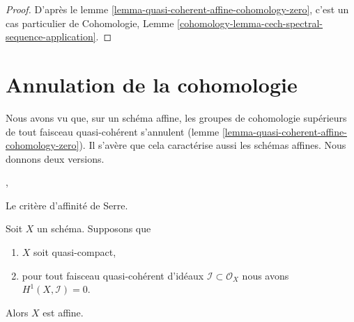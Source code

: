 \begin{proof}
D'après le
lemme \ref{lemma-quasi-coherent-affine-cohomology-zero},
c'est un cas particulier de
Cohomologie, Lemme
\ref{cohomology-lemma-cech-spectral-sequence-application}.
\end{proof}







\section{Annulation de la cohomologie}
\label{section-vanishing}

\noindent
Nous avons vu que, sur un schéma affine, les groupes de cohomologie supérieurs
de tout faisceau quasi-cohérent s'annulent
(lemme \ref{lemma-quasi-coherent-affine-cohomology-zero}).
Il s'avère que cela caractérise aussi
les schémas affines. Nous donnons deux versions.

\begin{lemma}
\label{lemma-quasi-compact-h1-zero-covering}
\begin{reference}
\cite{Serre-criterion}, \cite[II, Théorème 5.2.1 (d') et IV (1.7.17)]{EGA}
\end{reference}
\begin{slogan}
Le critère d'affinité de Serre.
\end{slogan}
Soit $X$ un schéma.
Supposons que
\begin{enumerate}
\item $X$ soit quasi-compact,
\item pour tout faisceau quasi-cohérent d'idéaux
$\mathcal{I} \subset \mathcal{O}_X$ nous avons $H^1(X, \mathcal{I}) = 0$.
\end{enumerate}
Alors $X$ est affine.
\end{lemma}

